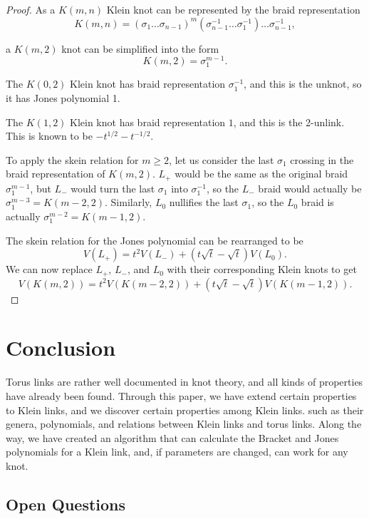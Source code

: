 \documentclass[12pt]{article}
\begin{document}
\begin{proof}

As a $K(m, n)$ Klein knot can be represented by the braid representation $$K(m, n) = (\sigma_1 \dots \sigma_{n - 1})^m (\sigma_{n - 1}^{-1} \dots \sigma_1^{-1}) \dots \sigma_{n - 1}^{-1},$$

a $K(m, 2)$ knot can be simplified into the form $$K(m, 2) = \sigma_1^{m - 1}.$$

The $K(0, 2)$ Klein knot has braid representation $\sigma_1^{-1}$, and this is the unknot, so it has Jones polynomial 1. 

The $K(1, 2)$ Klein knot has braid representation $1$, and this is the 2-unlink. This is known to be $- t^{1/2} - t^{-1/2}.$ 

To apply the skein relation for $m \geq 2$, let us consider the last $\sigma_1$ crossing in the braid representation of $K(m, 2)$. $L_+$ would be the same as the original braid $\sigma_1^{m - 1}$, but $L_-$ would turn the last $\sigma_1$ into $\sigma_1^{-1}$, so the $L_-$ braid would actually be $\sigma_1^{m - 3} = K(m - 2, 2)$. Similarly, $L_0$ nullifies the last $\sigma_1$, so the $L_0$ braid is actually $\sigma_1^{m - 2} = K(m - 1, 2)$. 

The skein relation for the Jones polynomial can be rearranged to be $$V(L_+) = t^2 V(L_-) + (t \sqrt{t} - \sqrt{t}) V(L_0).$$ We can now replace $L_+$, $L_-$, and $L_0$ with their corresponding Klein knots to get $$V(K(m, 2)) = t^2 V(K(m - 2, 2)) + (t \sqrt{t} - \sqrt{t}) V(K(m - 1, 2)).$$

\end{proof}

\section{Conclusion}

Torus links are rather well documented in knot theory, and all kinds of properties have already been found. Through this paper, we have extend certain properties to Klein links, and we discover certain properties among Klein links. such as their genera, polynomials, and relations between Klein links and torus links. Along the way, we have created an algorithm that can calculate the Bracket and Jones polynomials for a Klein link, and, if parameters are changed, can work for any knot. 

\subsection{Open Questions}
\end{document}
